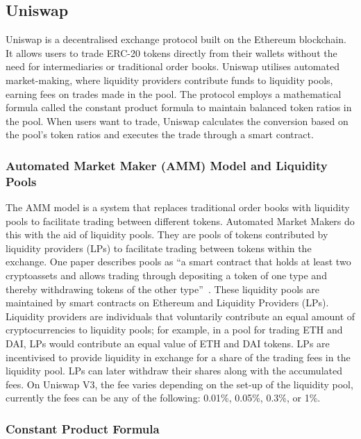 \subsection{Uniswap}

Uniswap is a decentralised exchange protocol built on the Ethereum blockchain. It allows users to trade ERC-20 tokens directly from their wallets without the need for intermediaries or traditional order books. Uniswap utilises automated market-making, where liquidity providers contribute funds to liquidity pools, earning fees on trades made in the pool. The protocol employs a mathematical formula called the constant product formula to maintain balanced token ratios in the pool. When users want to trade, Uniswap calculates the conversion based on the pool's token ratios and executes the trade through a smart contract.

\subsubsection{Automated Market Maker (AMM) Model and Liquidity Pools}

The AMM model is a system that replaces traditional order books with liquidity pools to facilitate trading between different tokens. Automated Market Makers do this with the aid of liquidity pools. They are pools of tokens contributed by liquidity providers (LPs) to facilitate trading between tokens within the exchange. One paper describes pools as ``a smart contract that holds at least two cryptoassets and allows trading through depositing a token of one type and thereby withdrawing tokens of the other type''~\cite{schar2021decentralized}. These liquidity pools are maintained by smart contracts on Ethereum and Liquidity Providers (LPs). Liquidity providers are individuals that voluntarily contribute an equal amount of cryptocurrencies to liquidity pools; for example, in a pool for trading ETH and DAI, LPs would contribute an equal value of ETH and DAI tokens. LPs are incentivised to provide liquidity in exchange for a share of the trading fees in the liquidity pool. LPs can later withdraw their shares along with the accumulated fees. On Uniswap V3, the fee varies depending on the set-up of the liquidity pool, currently the fees can be any of the following: 0.01\%, 0.05\%, 0.3\%, or 1\%.

\subsubsection{Constant Product Formula}

